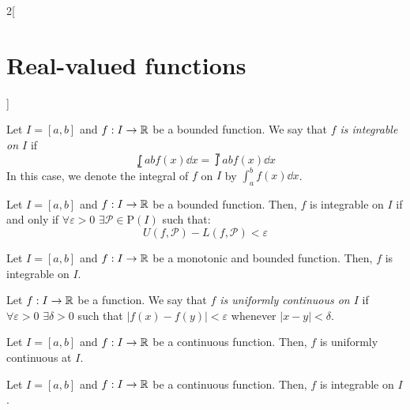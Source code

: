 \documentclass[../../../main.tex]{subfiles}
\begin{document}
\begin{multicols}{2}[\section{Real-valued functions}]
\begin{definition}
    \end{definition}
    \begin{definition}\label{RVF-integrable}
        Let $I=[a,b]$ and $f:I\rightarrow\mathbb{R}$ be a bounded function. We say that \textit{$f$ is integrable on $I$} if $$\lowint{a}{b}f(x)\dd x=\upint{a}{b}f(x)\dd x$$ In this case, we denote the integral of $f$ on $I$ by $\displaystyle\int_a^b f(x)\dd x$.
    \end{definition}
    \begin{lemma}
        Let $I=[a,b]$ and $f:I\rightarrow\mathbb{R}$ be a bounded function. Then, $f$ is integrable on $I$ if and only if $\forall\varepsilon>0$ $\exists\mathcal{P}\in\mathrm{P}(I)$ such that: $$U(f,\mathcal{P})-L(f,\mathcal{P})<\varepsilon$$
    \end{lemma}
    \begin{theorem}
        Let $I=[a,b]$ and $f:I\rightarrow\mathbb{R}$ be a monotonic and bounded function. Then, $f$ is integrable on $I$.
    \end{theorem}
    \begin{definition}
        Let $f:I\rightarrow\mathbb{R}$ be a function. We say that \textit{$f$ is uniformly continuous on $I$} if $\forall\varepsilon>0$ $\exists\delta>0$ such that $|f(x)-f(y)|<\varepsilon$ whenever $|x-y|<\delta$.
    \end{definition}
    \begin{theorem}
        Let $I=[a,b]$ and $f:I\rightarrow\mathbb{R}$ be a continuous function. Then, $f$ is uniformly continuous at $I$.
    \end{theorem}
    \begin{theorem}
        Let $I=[a,b]$ and $f:I\rightarrow\mathbb{R}$ be a continuous function. Then, $f$ is integrable on $I$.
    \end{theorem}

\end{multicols}
\end{document}
